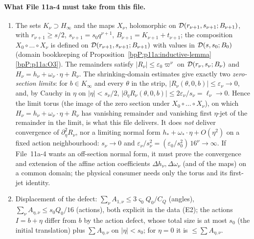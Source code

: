 \paragraph{What File 11a-4 must take from this file.}
\begin{enumerate}[label=(T\arabic*)]
\item The sets $K_\nu\supset H_\infty$ and the maps $X_\nu$, holomorphic on $\mathcal D(r_{\nu+1},s_{\nu+1};B_{\nu+1})$, with $r_{\nu+1}\ge s/2$, $s_{\nu+1}=s_0q^{\nu+1}$, $B_{\nu+1}=K_{\nu+1}+t_{\nu+1}$; the composition $X_0\circ\dots\circ X_\nu$ is defined on $\mathcal D(r_{\nu+1},s_{\nu+1};B_{\nu+1})$ with values in $\mathcal D(s,s_0;B_0)$ (domain bookkeeping of Proposition~\ref{bpP:p11a:inductive-lemma}\ref{bpP:p11a:O3}). The remainders satisfy $\lvert R_\nu\rvert\le\varepsilon_0\varpi^\nu$ on $\mathcal D(r_\nu,s_\nu;B_\nu)$ and $H_\nu=h_\nu+\omega_\nu\cdot\eta+R_\nu$. The shrinking-domain estimates give exactly two \emph{zero-section limits}: for $b\in K_\infty$ and every $\theta$ in the strip, $\lvert R_\nu(\theta,0,b)\rvert\le\varepsilon_\nu\to0$, and, by Cauchy in $\eta$ on $\lvert\eta\rvert<s_\nu/2$, $\lvert\partial_\eta R_\nu(\theta,0,b)\rvert\le2\varepsilon_\nu/s_\nu=\ell_\nu\to0$. Hence the limit torus (the image of the zero section under $X_0\circ\dots\circ X_\nu$), on which $H_\nu=h_\nu+\omega_\nu\cdot\eta+R_\nu$ has vanishing remainder and vanishing first $\eta$-jet of the remainder in the limit, is what this file delivers. It does \emph{not} deliver convergence of $\partial_\eta^2R_\nu$, nor a limiting normal form $h_*+\omega_*\cdot\eta+O(\eta^2)$ on a fixed action neighbourhood: $s_\nu\to0$ and $\varepsilon_\nu/s_\nu^2=(\varepsilon_0/s_0^2)\,16^\nu\to\infty$. If File~11a-4 wants an off-section normal form, it must prove the convergence and extension of the affine action coefficients $\Delta h_\nu,\Delta\omega_\nu$ (and of the maps) on a common domain; the physical consumer needs only the torus and its first-jet identity.
\item Displacement of the defect: $\sum_\nu A_{1,\nu}\le3\varsigma_0Q_0/C_Q$ (angles), $\sum_\nu A_{\eta,\nu}\le s_0Q_0/16$ (actions), both explicit in the data (E2); the actions $I=b+\eta$ differ from $b$ by the action defect, whose total size is at most $s_0$ (the initial translation) plus $\sum A_{\eta,\nu}$ on $\lvert\eta\rvert<s_0$; for $\eta=0$ it is $\le\sum A_{\eta,\nu}$.

\end{enumerate}
